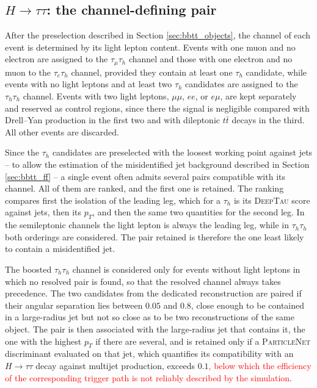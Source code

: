 \subsection{\texorpdfstring{$H\to\tau\tau$}{H->tautau}: the channel-defining pair}
%
After the preselection described in Section \ref{sec:bbtt_objects}, the channel of each event is determined by its light lepton content. Events with one muon and no electron are assigned to the $\tau_\mu\tau_h$ channel and those with one electron and no muon to the $\tau_e\tau_h$ channel, provided they contain at least one $\tau_h$ candidate, while events with no light leptons and at least two $\tau_h$ candidates are assigned to the $\tau_h\tau_h$ channel. Events with two light leptons, $\mu\mu$, $ee$, or $e\mu$, are kept separately and reserved as control regions, since there the signal is negligible compared with Drell--Yan production in the first two and with dileptonic $t\bar{t}$ decays in the third. All other events are discarded.

Since the $\tau_h$ candidates are preselected with the loosest working point against jets -- to allow the estimation of the misidentified jet background described in Section \ref{sec:bbtt_ff} -- a single event often admits several pairs compatible with its channel. All of them are ranked, and the first one is retained. The ranking compares first the isolation of the leading leg, which for a $\tau_h$ is its \textsc{DeepTau} score against jets, then its $p_T$, and then the same two quantities for the second leg. In the semileptonic channels the light lepton is always the leading leg, while in $\tau_h\tau_h$ both orderings are considered. The pair retained is therefore the one least likely to contain a misidentified jet.

The boosted $\tau_h\tau_h$ channel is considered only for events without light leptons in which no resolved pair is found, so that the resolved channel always takes precedence. The two candidates from the dedicated reconstruction are paired if their angular separation lies between $0.05$ and $0.8$, close enough to be contained in a large-radius jet but not so close as to be two reconstructions of the same object. The pair is then associated with the large-radius jet that contains it, the one with the highest $p_T$ if there are several, and is retained only if a \textsc{ParticleNet} discriminant evaluated on that jet, which quantifies its compatibility with an $H\to\tau\tau$ decay against multijet production, exceeds $0.1$\textcolor{red}{, below which the efficiency of the corresponding trigger path is not reliably described by the simulation}.\medskip

